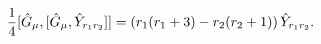 \begin{equation}
\frac{1}{4}[\hat{G}_{\mu},[\hat{G}_{\mu},
\hat{Y}_{r_{1}r_{2}}]]
=\left(r_{1}(r_{1}+3)-r_{2}(r_{2}+1)\right)
\hat{Y}_{r_{1}r_{2}}. 
\label{eigenvalueofadG^{2}}
\end{equation}

